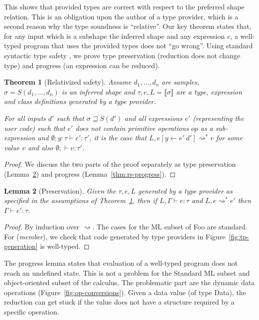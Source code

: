 \documentclass[10pt,preprint,clearpagebib]{sigplanconf}
\newcommand{\ident}[1]{\textnormal{\sffamily #1}}
\newcommand{\reduce}{\rightsquigarrow}
\newcommand{\sem}[1]{\llbracket #1 \rrbracket}
\newcommand{\semalt}[1]{S(#1)}
\newtheorem{theorem}{Theorem}
\newtheorem{lemma}[theorem]{Lemma}
\begin{document}
\noindent
This shows that provided types are correct with respect to the preferred shape relation. 
This is an obligation upon the author of a type provider, which is a second reason why
the type soundness is ``relative''.
Our key theorem states that, for any input which is a subshape the inferred shape and 
any expression $e$, a well-typed program that uses the provided types does not ``go wrong''.
Using standard syntactic type safety  \cite{syntactic}, we prove type preservation 
(reduction does not change type) and progress (an expression can be reduced).

\begin{theorem}[Relativized safety]
\label{thm:safety}
Assume $d_1, \ldots, d_n$ are samples, $\sigma=\semalt{d_1, \ldots, d_n}$ is an inferred
shape and $\tau,e,L = \sem{\sigma}$ are a type, expression and class definitions generated by a 
type provider.

For all inputs $d'$ such that $\sigma \sqsupseteq \semalt{d'}$ and all expressions $e'$
(representing the user code) such that $e'$ does not contain primitive operations $op$ as a sub-expression and
$\emptyset; y\!:\!\tau \vdash e'\!:\!\tau'$, it is the case that $L, e[y\leftarrow e'~d'] \reduce^{*} v$ for some value $v$ and
also $\emptyset; \vdash v : \tau'$.
\end{theorem}
\begin{proof}
We discuss the two parts of the proof separately as type preservation (Lemma~\ref{thm:rs-preservation})
and progress (Lemma~\ref{thm:rs-progress}).
\end{proof}

\begin{lemma}[Preservation]
\label{thm:rs-preservation}
Given the $\tau, e, L$ generated by a type provider as specified in
the assumptions of Theorem~\ref{thm:safety}, then if $L, \Gamma \vdash e : \tau$ and 
$L, e \reduce^{*} e'$ then $\Gamma \vdash e' : \tau$.
\end{lemma}
\begin{proof}
By induction over $\reduce$. The cases for the ML subset of Foo 
are standard. For (\emph{member}), we check that code generated by type providers
in Figure~\ref{fig:tp-generation} is well-typed.
\end{proof}

\noindent
The progress lemma states that evaluation of a well-typed program does not reach an undefined state. 
This is not a problem for the Standard ML \cite{sml} subset and object-oriented subset \cite{fwjava} of the calculus. The 
problematic part are the dynamic data operations (Figure~\ref{fig:op-conversions}). Given a data
value (of type \ident{Data}), the reduction can get stuck if the value does not have a structure 
required by a specific operation.
\end{document}
